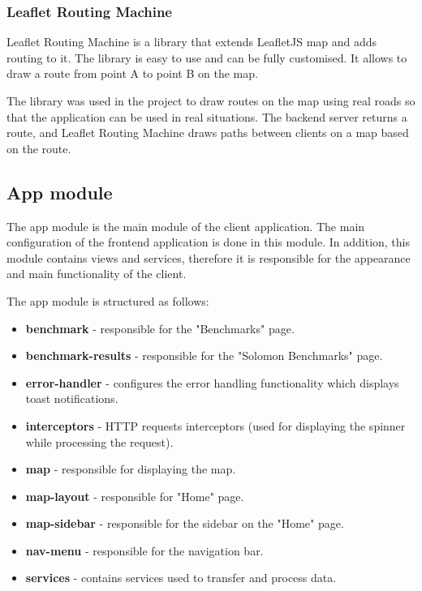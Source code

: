 \documentclass[a4paper,twoside,12pt]{book}
\begin{document}
\subsubsection{Leaflet Routing Machine}

Leaflet Routing Machine is a library that extends LeafletJS map and adds routing to it. The library is easy to use and can be fully customised. It allows to draw a route from point A to point B on the map.

The library was used in the project to draw routes on the map using real roads so that the application can be used in real situations. The backend server returns a route, and Leaflet Routing Machine draws paths between clients on a map based on the route.

\subsection{App module}

The app module is the main module of the client application. The main configuration of the frontend application is done in this module. In addition, this module contains views and services, therefore it is responsible for the appearance and main functionality of the client. 

The app module is structured as follows: 

\begin{itemize}
    \item \textbf{benchmark} - responsible for the "Benchmarks" page.
    \item \textbf{benchmark-results} - responsible for the "Solomon Benchmarks" page.
    \item \textbf{error-handler} - configures the error handling functionality which displays toast notifications.
    \item \textbf{interceptors} - HTTP requests interceptors (used for displaying the spinner while processing the request).
    \item \textbf{map} - responsible for displaying the map.
    \item \textbf{map-layout} - responsible for "Home" page.
    \item \textbf{map-sidebar} - responsible for the sidebar on the "Home" page.
    \item \textbf{nav-menu} - responsible for the navigation bar.
    \item \textbf{services} - contains services used to transfer and process data.    
\end{itemize}
\end{document}
